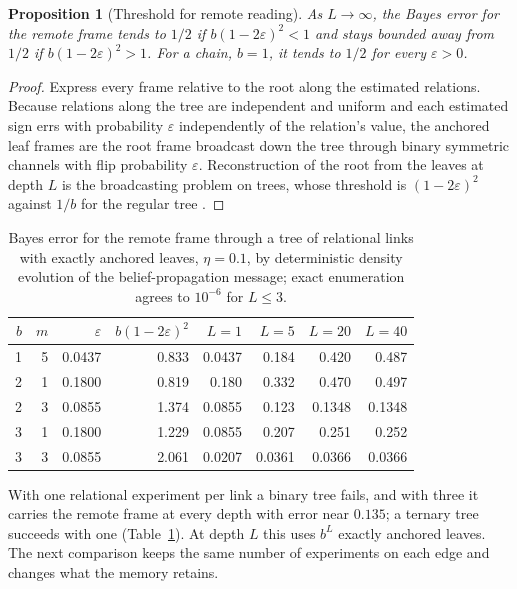 \documentclass[11pt,a4paper]{article}
\newtheorem{proposition}[definition]{Proposition}
\begin{document}
\begin{proposition}[Threshold for remote reading]\label{prop:tree}
As $L\to\infty$, the Bayes error for the remote frame tends to $1/2$ if $b(1-2\varepsilon)^2<1$ and stays bounded away from $1/2$ if $b(1-2\varepsilon)^2>1$. For a chain, $b=1$, it tends to $1/2$ for every $\varepsilon>0$.
\end{proposition}
\begin{proof}
Express every frame relative to the root along the estimated relations. Because relations along the tree are independent and uniform and each estimated sign errs with probability $\varepsilon$ independently of the relation's value, the anchored leaf frames are the root frame broadcast down the tree through binary symmetric channels with flip probability $\varepsilon$. Reconstruction of the root from the leaves at depth $L$ is the broadcasting problem on trees, whose threshold is $(1-2\varepsilon)^2$ against $1/b$ for the regular tree \cite{EKPS2000}.
\end{proof}

\begin{table}[ht]
\centering
\begin{tabular}{rrrrrrrr}
\toprule
$b$ & $m$ & $\varepsilon$ & $b(1-2\varepsilon)^2$ & $L=1$ & $L=5$ & $L=20$ & $L=40$\\
\midrule
1 & 5 & 0.0437 & 0.833 & 0.0437 & 0.184 & 0.420 & 0.487\\
2 & 1 & 0.1800 & 0.819 & 0.180 & 0.332 & 0.470 & 0.497\\
2 & 3 & 0.0855 & 1.374 & 0.0855 & 0.123 & 0.1348 & 0.1348\\
3 & 1 & 0.1800 & 1.229 & 0.0855 & 0.207 & 0.251 & 0.252\\
3 & 3 & 0.0855 & 2.061 & 0.0207 & 0.0361 & 0.0366 & 0.0366\\
\bottomrule
\end{tabular}
\caption{Bayes error for the remote frame through a tree of relational links with exactly anchored leaves, $\eta=0.1$, by deterministic density evolution of the belief-propagation message; exact enumeration agrees to $10^{-6}$ for $L\le3$.}\label{tab:tree}
\end{table}

With one relational experiment per link a binary tree fails, and with three it carries the remote frame at every depth with error near $0.135$; a ternary tree succeeds with one (Table~\ref{tab:tree}). At depth $L$ this uses $b^L$ exactly anchored leaves. The next comparison keeps the same number of experiments on each edge and changes what the memory retains.
\end{document}
